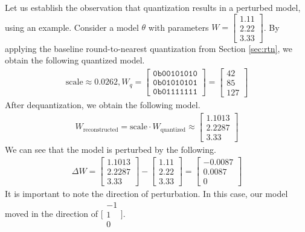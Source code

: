 \documentclass[../main.tex]{subfiles}
\begin{document}
Let us establish the observation that quantization results in a perturbed model, using an example. Consider a model $\theta$ with parameters $W = \begin{bmatrix}
1.11 \\ 2.22 \\ 3.33
\end{bmatrix}$. By applying the baseline round-to-nearest quantization from Section \ref{sec:rtn}, we obtain the following quantized model.
\begin{align}
    \text{scale} \approx 0.0262, W_{q} = \begin{bmatrix}
\texttt{0b00101010}\\ \texttt{0b01010101} \\ \texttt{0b01111111}
\end{bmatrix} = \begin{bmatrix}
42 \\ 85 \\ 127
\end{bmatrix}
\end{align}
After dequantization, we obtain the following model.
\begin{align}
W_{\text{reconstructed}} = \text{scale} \cdot W_{\text{quantized}} \approx \begin{bmatrix}
1.1013 \\ 2.2287 \\ 3.33
\end{bmatrix}
\end{align}
We can see that the model is perturbed by the following.
\begin{align}
    \Delta W = \begin{bmatrix}
1.1013 \\ 2.2287 \\ 3.33
\end{bmatrix} - \begin{bmatrix}
1.11 \\ 2.22 \\ 3.33
\end{bmatrix}
=\begin{bmatrix}
-0.0087 \\ 0.0087 \\ 0 \end{bmatrix}
\end{align}
It is important to note the direction of perturbation. In this case, our model moved in the direction of $\big[\begin{smallmatrix}
-1 \\ 1 \\ 0 \end{smallmatrix}\big]$.
\end{document}
